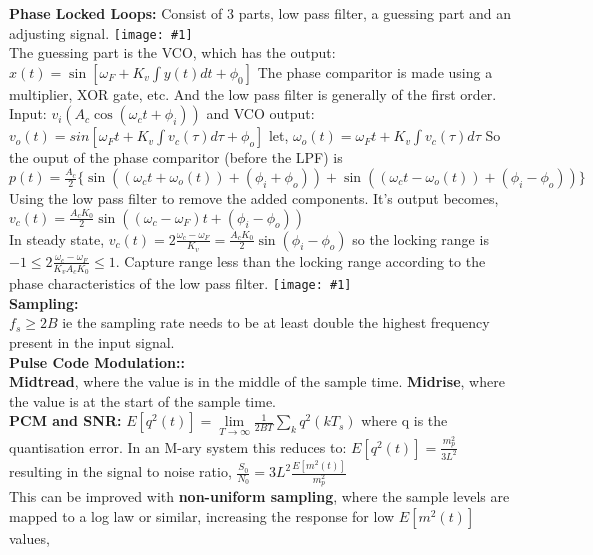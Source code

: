 \documentclass[10pt,landscape,a4paper]{article}
\newcommand{\inlineimage}[1]{\texttt{[image: \#1]}\\}
\newcommand{\minititle}[1]{\textbf{#1:}\\}
\begin{document}
\begin{multicols*}{4}
		\textbf{Phase Locked Loops:}
		Consist of 3 parts, low pass filter, a guessing part and an adjusting signal.
		\inlineimage{phaselockedloop.png}
		The guessing part is the VCO, which has the output:\\
		$ x(t) = \sin\left[\omega_F + K_v \int y(t)dt + \phi_0 \right] $
		The phase comparitor is made using a multiplier, XOR gate, etc. And the low pass filter is generally of the first order.\\
		Input: $ v_i(A_c\cos(\omega_ct+\phi_i)) $ and VCO output: $ v_o(t) =sin\left[\omega_Ft+K_v\int v_c(\tau)d\tau+\phi_o\right] $ let, $ \omega_o(t) = \omega_Ft+K_v\int v_c(\tau)d\tau $ So the ouput of the phase comparitor (before the LPF) is $ p(t) = \frac{A_c}{2}\{\sin((\omega_ct+\omega_o(t))+(\phi_i + \phi_o))+\sin((\omega_ct-\omega_o(t))+(\phi_i - \phi_o))\} $\\
		Using the low pass filter to remove the added components. It's output becomes, $ v_c(t) = \frac{A_cK_0}{2}\sin((\omega_c-\omega_F)t+(\phi_i - \phi_o)) $ \\
		In steady state, $ v_c(t) = 2\frac{\omega_c-\omega_F}{K_v} = \frac{A_cK_0}{2}\sin(\phi_i-\phi_o) $ so the locking range is $ -1 \le 2\frac{\omega_c-\omega_F}{K_vA_cK_0} \le 1 $. Capture range less than the locking range according to the phase characteristics of the low pass filter. 
		\inlineimage{pllapplied.png}
		\minititle{Sampling}
		$ f_s \geq 2B $ ie the sampling rate needs to be at least double the highest frequency present in the input signal.\\
		\minititle{Pulse Code Modulation:}
		\textbf{Midtread}, where the value is in the middle of the sample time. \textbf{Midrise}, where
		the value is at the start of the sample time.\\
		\textbf{PCM and SNR:} $ E\left[q^2(t)\right] = \lim\limits_{T\rightarrow\infty}\frac{1}{2BT}
		\sum_kq^2(kT_s) $ where q is the quantisation error. In an M-ary system this reduces to: $ E\left[q^2(t)\right] = \frac{m_p^2}{3L^2} $ resulting in the signal to noise ratio,
		 $ \frac{S_0}{N_0} = 3L^2\frac{E\left[m^2(t)\right]}{m_p^2} $\\
		 This can be improved with \textbf{non-uniform sampling}, where the sample levels are mapped to a log law or similar, increasing the response for low $ E\left[m^2(t)\right] $ values,
	\end{multicols*}
\end{document}
